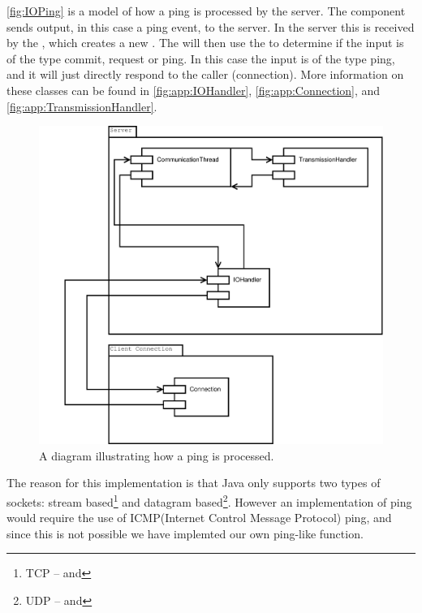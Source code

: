 \autoref{fig:IOPing} is a model of how a ping is processed by the server. The  component sends output, in this case a ping event, to the server. In the server this is received by the , which creates a new \newline {}.
The  will then use the \newline {} to determine if the input is of the type commit, request or ping.
In this case the input is of the type ping, and it will just directly respond to the caller (connection). 
More information on these classes can be found in \autoref{fig:app:IOHandler}, \autoref{fig:app:Connection}, and \autoref{fig:app:TransmissionHandler}.
\begin{figure}[htbp]
	\centering
          \includegraphics[scale=0.30]{images/ping}
	\caption{A diagram illustrating how a ping is processed.} 
	\label{fig:IOPing}
\end{figure}

The reason for this implementation is that Java only supports two types of sockets: stream based\footnote{TCP --  and } and datagram based\footnote{UDP --  and }\cite{javaNET}.
However an implementation of ping would require the use of ICMP(Internet Control Message Protocol) ping, and since this is not possible we have implemted our own ping-like function\cite{ICMP}.


